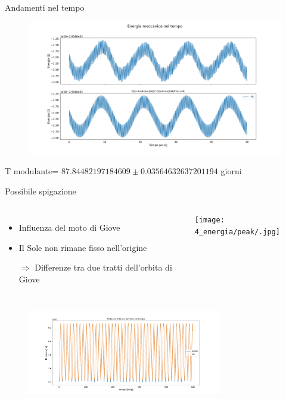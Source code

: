         \begin{frame}{Andamenti nel tempo}
            \begin{figure}
                \centering
                \includegraphics[width=\textwidth]{4_energia/peak/mec_50_1.png}\\
                \label{cfr::E6T}    
            \end{figure}  
            T modulante= $87.84482197184609 \pm 0.03564632637201194$ giorni\\
        \end{frame}

        \begin{frame}{Possibile spigazione}
            \begin{columns}
                    \begin{itemize}
                        \item Influenza del moto di Giove
                        \item Il Sole non rimane fisso nell'origine
                        \item[$\Rightarrow$] Differenze tra due tratti dell'orbita di Giove
                    \end{itemize}
                    \centering        
                    \texttt{[image: 4\_energia/peak/.jpg]}\\
                    \label{cfr::eme}      
            \end{columns}
            \begin{figure}
                \centering
                \includegraphics[height=3.75cm]{4_energia/peak/giove_fit.png}\\
            \end{figure}
        \end{frame}

